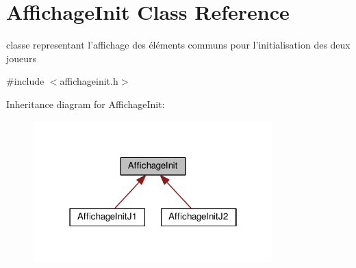 \hypertarget{classAffichageInit}{\section{Affichage\+Init Class Reference}
\label{classAffichageInit}
}


classe representant l'affichage des éléments communs pour l'initialisation des deux joueurs  




{\ttfamily \#include $<$affichageinit.\+h$>$}



Inheritance diagram for Affichage\+Init\+:
\nopagebreak
\begin{figure}[H]
\begin{center}
\leavevmode
\includegraphics[width=262pt]{classAffichageInit__inherit__graph}
\end{center}
\end{figure}
